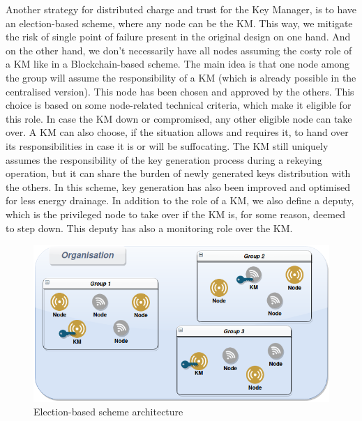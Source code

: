 Another strategy for distributed charge and trust for the Key Manager, is to have an election-based scheme, where any node can be the KM. This way, we mitigate the risk of single point of failure present in the original design on one hand. And on the other hand, we don’t necessarily have all nodes assuming the costy role of a KM like in a Blockchain-based scheme. The main idea is that one node among the group will assume the responsibility of a KM (which is already possible in the centralised version). This node has been chosen and approved by the others. This choice is based on some node-related technical criteria, which make it eligible for this role. In case the KM down or compromised, any other eligible node can take over. A KM can also choose, if the situation allows and requires it, to hand over its responsibilities in case it is or will be suffocating. The KM still uniquely assumes the responsibility of the key generation process during a rekeying operation, but it can share the burden of newly generated keys distribution with the others. In this scheme, key generation has also been improved and optimised for less energy drainage. In addition to the role of a KM, we also define a deputy, which is the privileged node to take over if the KM is, for some reason, deemed to step down. This deputy has also a monitoring role over the KM.

\begin{figure}[htbp]
	\centerline{\includegraphics[scale=0.50]{figures/organisation.png}}
	\caption{Election-based scheme architecture}
	\label{fig}
\end{figure}

